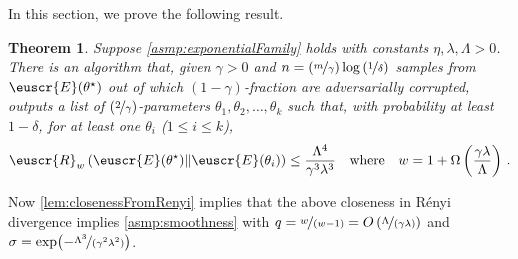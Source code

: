 \documentclass[11pt]{article}
\theoremstyle{plain}
\newtheorem{theorem}{Theorem}[section]
\theoremstyle{definition}
\theoremstyle{remark}
\newcommand{\quadtext}[1]{\quad\text{#1}\quad}
\newcommand{\quadwhere}{\quadtext{where}}
\newcommand{\inparen}[1]{\left(#1\right)}
\newcommand{\renyi}[3]{\cR_{#1}\inparen{#2\|#3}}
\newcommand{\nfrac}[2]{\nicefrac{#1}{#2}}
\newcommand{\customcal}[1]{\euscr{#1}}
\newcommand{\cE}{\customcal{E}}
\newcommand{\cR}{\customcal{R}}
\begin{document}
            \noindent In this section, we prove the following result.
            \begin{theorem}\label{thm:listDecoding:expFamily}
                Suppose \cref{asmp:exponentialFamily} holds with constants $\eta,\lambda,\Lambda>0$.
                There is an algorithm that, given $\gamma>0$ and $n={\inparen{\nfrac{m}{\gamma}}\log\inparen{\nfrac{1}{\delta}}}$ samples from $\cE(\theta^\star)$ out of which $(1-\gamma)$-fraction are adversarially corrupted, %
                outputs a list of $\inparen{\nfrac{2}{\gamma}}$-parameters $\theta_1,\theta_2,\dots,\theta_k$ such that, with probability at least $1-\delta$,
                for at least one $\theta_i$ ($1\leq i\leq k$), 
                \[
                    \renyi{w}{\cE(\theta^\star)}{\cE(\theta_i)}
                    \leq 
                    \frac{
                        \Lambda^4
                    }{
                        \gamma^3\lambda^3 
                    }
                    \quadwhere
                    w = 1 + \Omega\inparen{\frac{\gamma\lambda}{\Lambda}}
                    \,.
                \]
            \end{theorem}
            Now \cref{lem:closenessFromRenyi} implies that the above closeness in Rényi divergence implies \cref{asmp:smoothness} with $q=\nfrac{w}{(w-1)}=O\inparen{\nfrac{\Lambda}{(\gamma \lambda)}}$ and $\sigma=\exp(-\nfrac{\Lambda^3}{(\gamma^2\lambda^2)})$.
\end{document}
